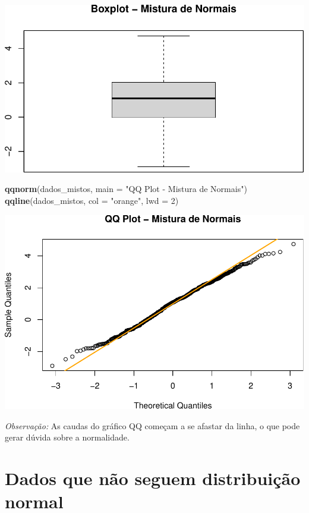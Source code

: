 \documentclass[
]{book}
\newenvironment{Shaded}{\begin{snugshade}}{\end{snugshade}}
\newcommand{\AttributeTok}[1]{\textcolor[rgb]{0.13,0.29,0.53}{#1}}
\newcommand{\DecValTok}[1]{\textcolor[rgb]{0.00,0.00,0.81}{#1}}
\newcommand{\FunctionTok}[1]{\textcolor[rgb]{0.13,0.29,0.53}{\textbf{#1}}}
\newcommand{\NormalTok}[1]{#1}
\newcommand{\StringTok}[1]{\textcolor[rgb]{0.31,0.60,0.02}{#1}}
\begin{document}
\includegraphics{LivroEstatisticaR_files/figure-latex/duvidosaDist-2.pdf}

\begin{Shaded}
\begin{Highlighting}[]
\FunctionTok{qqnorm}\NormalTok{(dados\_mistos, }\AttributeTok{main =} \StringTok{"QQ Plot {-} Mistura de Normais"}\NormalTok{)}
\FunctionTok{qqline}\NormalTok{(dados\_mistos, }\AttributeTok{col =} \StringTok{"orange"}\NormalTok{, }\AttributeTok{lwd =} \DecValTok{2}\NormalTok{)}
\end{Highlighting}
\end{Shaded}

\includegraphics{LivroEstatisticaR_files/figure-latex/duvidosaDist-3.pdf}

\emph{Observação:} As caudas do gráfico QQ começam a se afastar da linha, o que pode gerar dúvida sobre a normalidade.

\section{Dados que não seguem distribuição normal}\label{dados-que-nuxe3o-seguem-distribuiuxe7uxe3o-normal}
\end{document}
